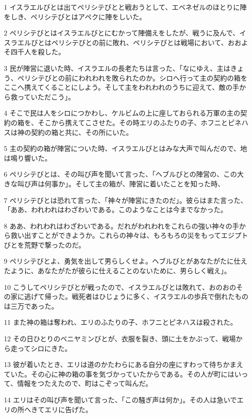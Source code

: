 \par 1 イスラエルびとは出てペリシテびとと戦おうとして、エベネゼルのほとりに陣をしき、ペリシテびとはアペクに陣をしいた。
\par 2 ペリシテびとはイスラエルびとにむかって陣備えをしたが、戦うに及んで、イスラエルびとはペリシテびとの前に敗れ、ペリシテびとは戦場において、おおよそ四千人を殺した。
\par 3 民が陣営に退いた時、イスラエルの長老たちは言った、「なにゆえ、主はきょう、ペリシテびとの前にわれわれを敗られたのか。シロへ行って主の契約の箱をここへ携えてくることにしよう。そして主をわれわれのうちに迎えて、敵の手から救っていただこう」。
\par 4 そこで民は人をシロにつかわし、ケルビムの上に座しておられる万軍の主の契約の箱を、そこから携えてこさせた。その時エリのふたりの子、ホフニとピネハスは神の契約の箱と共に、その所にいた。
\par 5 主の契約の箱が陣営についた時、イスラエルびとはみな大声で叫んだので、地は鳴り響いた。
\par 6 ペリシテびとは、その叫び声を聞いて言った、「ヘブルびとの陣営の、この大きな叫び声は何事か」。そして主の箱が、陣営に着いたことを知った時、
\par 7 ペリシテびとは恐れて言った、「神々が陣営にきたのだ」。彼らはまた言った、「ああ、われわれはわざわいである。このようなことは今までなかった。
\par 8 ああ、われわれはわざわいである。だれがわれわれをこれらの強い神々の手から救い出すことができようか。これらの神々は、もろもろの災をもってエジプトびとを荒野で撃ったのだ。
\par 9 ペリシテびとよ、勇気を出して男らしくせよ。ヘブルびとがあなたがたに仕えたように、あなたがたが彼らに仕えることのないために、男らしく戦え」。
\par 10 こうしてペリシテびとが戦ったので、イスラエルびとは敗れて、おのおのその家に逃げて帰った。戦死者はひじょうに多く、イスラエルの歩兵で倒れたものは三万であった。
\par 11 また神の箱は奪われ、エリのふたりの子、ホフニとピネハスは殺された。
\par 12 その日ひとりのベニヤミンびとが、衣服を裂き、頭に土をかぶって、戦場から走ってシロにきた。
\par 13 彼が着いたとき、エリは道のかたわらにある自分の座にすわって待ちかまえていた。その心に神の箱の事を気づかっていたからである。その人が町にはいって、情報をつたえたので、町はこぞって叫んだ。
\par 14 エリはその叫び声を聞いて言った、「この騒ぎ声は何か」。その人は急いでエリの所へきてエリに告げた。
